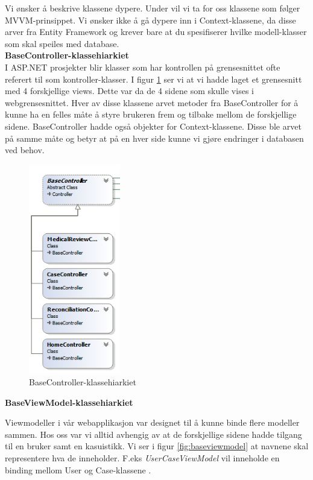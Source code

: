 Vi ønsker å beskrive klassene dypere. Under vil vi ta for oss klassene som følger MVVM-prinsippet. Vi ønsker ikke å gå dypere inn i Context-klassene, da disse arver fra Entity Framework og krever bare at du spesifiserer hvilke modell-klasser som skal speiles med database. \\

\textbf{BaseController-klassehiarkiet} \\
I ASP.NET prosjekter blir klasser som har kontrollen på grensesnittet ofte referert til som kontroller-klasser. I figur \ref{fig:basecontroller} ser vi at vi hadde laget et grensesnitt med 4 forskjellige views. Dette var da de 4 sidene som skulle vises i webgrensesnittet. Hver av disse klassene arvet metoder fra BaseController for å kunne ha en felles måte å styre brukeren frem og tilbake mellom de forskjellige sidene. BaseController hadde også objekter for Context-klassene. Disse ble arvet på samme måte og betyr at på en hver side kunne vi gjøre endringer i databasen ved behov.
\begin{figure}[H]
\centering
\includegraphics[width=4cm]{images/BaseController.png}
\caption{BaseController-klassehiarkiet}
\label{fig:basecontroller}
\end{figure}


\textbf{BaseViewModel-klassehiarkiet} 

Viewmodeller i vår webapplikasjon var designet til å kunne binde flere modeller sammen. Hos oss var vi alltid avhengig av at de forskjellige sidene hadde tilgang til en bruker samt en kasuistikk. Vi ser i figur \ref{fig:baseviewmodel} at navnene skal representere hva de inneholder. F.eks \textit{UserCaseViewModel} vil inneholde en binding mellom User og Case-klassene . 


